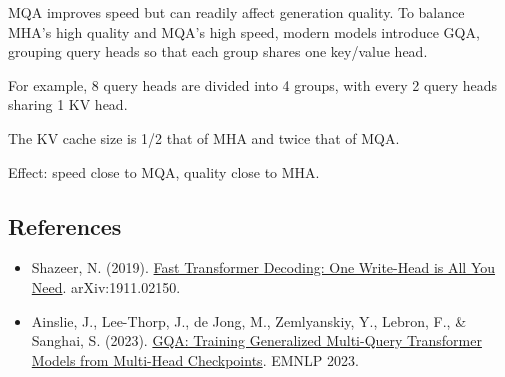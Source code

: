 MQA improves speed but can readily affect generation quality. To balance MHA's high quality and MQA's high speed, modern models introduce GQA, grouping query heads so that each group shares one key/value head.

For example, 8 query heads are divided into 4 groups, with every 2 query heads sharing 1 KV head.

The KV cache size is 1/2 that of MHA and twice that of MQA.

Effect: speed close to MQA, quality close to MHA.

\FloatBarrier
{}
\hypertarget{references-94}{%
\subsection{References}\label{references-94}}

\vspace{0.25em}
\begin{itemize}
\tightlist
\item
  Shazeer, N. (2019). \href{https://arxiv.org/abs/1911.02150}{Fast Transformer Decoding: One Write-Head is All You Need}. arXiv:1911.02150.
\item
  Ainslie, J., Lee-Thorp, J., de Jong, M., Zemlyanskiy, Y., Lebron, F., \& Sanghai, S. (2023). \href{https://arxiv.org/abs/2305.13245}{GQA: Training Generalized Multi-Query Transformer Models from Multi-Head Checkpoints}. EMNLP 2023.
\end{itemize}

\clearpage
